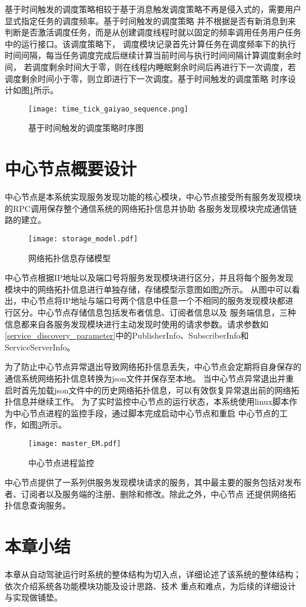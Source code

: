 基于时间触发的调度策略相较于基于消息触发调度策略不再是侵入式的，需要用户显式指定任务的调度频率。基于时间触发的调度策略
并不根据是否有新消息到来判断是否激活调度任务，而是从创建调度线程时就以固定的频率调用任务用户任务中的运行接口。该调度策略下，
调度模块记录首先计算任务在调度频率下的执行时间间隔，每当任务调度完成后继续计算当前时间与执行时间间隔计算调度剩余时间，
若调度剩余时间大于零，则在线程内睡眠剩余时间后再进行下一次调度，若调度剩余时间小于零，则立即进行下一次调度。基于时间触发的调度策略
时序设计如图\ref{time_tick_gaiyao_sequence}所示。
\begin{figure}[H]
  \centering
  \texttt{[image: time\_tick\_gaiyao\_sequence.png]}
  \caption{基于时间触发的调度策略时序图}
  \label{time_tick_gaiyao_sequence}
\end{figure}

\section{中心节点概要设计}
中心节点是本系统实现服务发现功能的核心模块，中心节点接受所有服务发现模块的RPC调用保存整个通信系统的网络拓扑信息并协助
各服务发现模块完成通信链路的建立。

\begin{figure}[htb]
  \centering
  \texttt{[image: storage\_model.pdf]}
  \caption{网络拓扑信息存储模型}
  \label{storage_model}
\end{figure}

中心节点根据IP地址以及端口号将服务发现模块进行区分，并且将每个服务发现模块中的网络拓扑信息进行单独存储，存储模型示意图如图\ref{storage_model}所示。
从图中可以看出，中心节点将IP地址与端口号两个信息中任意一个不相同的服务发现模块都进行区分。中心节点存储信息包括发布者信息、订阅者信息以及
服务端信息，三种信息都来自各服务发现模块进行主动发现时使用的请求参数。请求参数如\ref{service_discovery_parameter}中的PublisherInfo、SubscriberInfo和
ServiceServerInfo。

为了防止中心节点异常退出导致网络拓扑信息丢失，中心节点会定期将自身保存的通信系统网络拓扑信息转换为json文件并保存至本地。
当中心节点异常退出并重启时首先加载json文件中的历史网络拓扑信息，可以有效恢复异常退出前的网络拓扑信息并继续工作。
为了实时监控中心节点的运行状态，本系统使用linux脚本作为中心节点进程的监控手段，通过脚本完成启动中心节点和重启
中心节点的工作，如图\ref{master_EM}所示。
\begin{figure}[htb]
  \centering
  \texttt{[image: master\_EM.pdf]}
  \caption{中心节点进程监控}
  \label{master_EM}
\end{figure}

中心节点提供了一系列供服务发现模块请求的服务，其中最主要的服务包括对发布者、订阅者以及服务端的注册、删除和修改。除此之外，中心节点
还提供网络拓扑信息查询服务。


\section{本章小结}
本章从自动驾驶运行时系统的整体结构为切入点，详细论述了该系统的整体结构；依次介绍系统各功能模块功能及设计思路、技术
重点和难点，为后续的详细设计与实现做铺垫。




